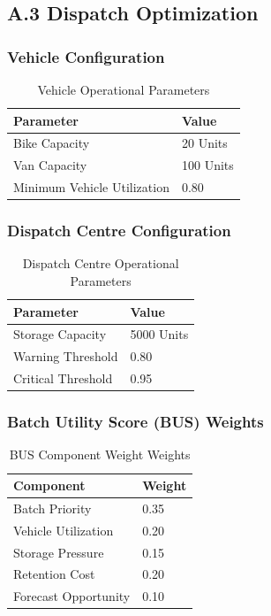 \documentclass{article}
\begin{document}
\subsection*{A.3 Dispatch Optimization}

\subsubsection*{Vehicle Configuration}
\begin{table}[htbp]
\centering
\caption{Vehicle Operational Parameters}
\label{tab:vehicle_config}
\begin{tabular}{ll}
\toprule
\textbf{Parameter} & \textbf{Value} \\
\midrule
Bike Capacity & 20 Units \\
Van Capacity & 100 Units \\
Minimum Vehicle Utilization & 0.80 \\
\bottomrule
\end{tabular}
\end{table}

\subsubsection*{Dispatch Centre Configuration}
\begin{table}[htbp]
\centering
\caption{Dispatch Centre Operational Parameters}
\label{tab:dispatch_centre_config}
\begin{tabular}{ll}
\toprule
\textbf{Parameter} & \textbf{Value} \\
\midrule
Storage Capacity & 5000 Units \\
Warning Threshold & 0.80 \\
Critical Threshold & 0.95 \\
\bottomrule
\end{tabular}
\end{table}

\subsubsection*{Batch Utility Score (BUS) Weights}
\begin{table}[htbp]
\centering
\caption{BUS Component Weight Weights}
\label{tab:bus_weights}
\begin{tabular}{ll}
\toprule
\textbf{Component} & \textbf{Weight} \\
\midrule
Batch Priority & 0.35 \\
Vehicle Utilization & 0.20 \\
Storage Pressure & 0.15 \\
Retention Cost & 0.20 \\
Forecast Opportunity & 0.10 \\
\bottomrule
\end{tabular}
\end{table}
\end{document}
